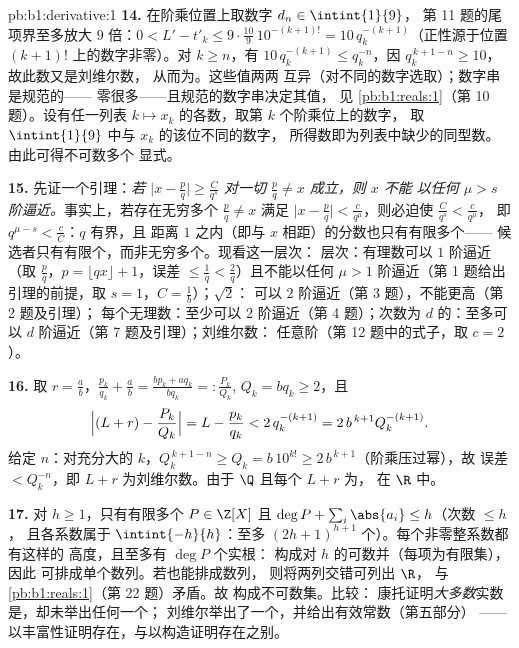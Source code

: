 \begin{solution}{pb:b1:derivative:1}
\textbf{14.} 在阶乘位置上取数字 $d_n \in \intint{1}{9}$，
第 11 题的尾项界至多放大
$9$ 倍：$0 < L' - t'_k \leq 9\cdot\frac{10}{9}\,10^{-(k+1)!} =
10\,q_k^{-(k+1)}$（正性源于位置
$(k+1)!$ 上的数字非零）。对 $k \geq n$，有 $10\,q_k^{-(k+1)} \leq
q_k^{-n}$，因 $q_k^{\,k+1-n} \geq 10$，故此数又是刘维尔数，
从而为。这些值两两
互异（对不同的数字选取）；数字串是规范的——
零很多——且规范的数字串决定其值，
见 \cref{pb:b1:reals:1}（第 10 题）。设有任一列表 $k \mapsto
x_k$ 的各数，取第 $k$ 个阶乘位上的数字，
取 $\intint{1}{9}$ 中与 $x_k$ 的该位不同的数字，
所得数即为列表中缺少的同型数。由此可得不可数多个
显式。

\textbf{15.} 先证一个引理：\emph{若 $\bigl|x - \frac pq\bigr|
\geq \frac{C}{q^s}$ 对一切 $\frac pq \neq x$ 成立，则 $x$ 不能
以任何 $\mu > s$ 阶逼近。}事实上，若存在无穷多个
$\frac pq \neq x$ 满足 $\bigl|x - \frac pq\bigr| <
\frac{c}{q^\mu}$，则必迫使 $\frac{C}{q^s} < \frac{c}{q^\mu}$，
即 $q^{\mu - s} < \frac cC$：$q$ 有界，且
距离 $1$ 之内（即与 $x$ 相距）的分数也只有有限多个——
候选者只有有限个，而非无穷多个。现看这一层次：
层次：有理数可以 $1$ 阶逼近（取 $\frac
pq$，$p = \lfloor qx\rfloor + 1$，误差 $\leq \frac1q <
\frac2q$）且不能以任何 $\mu > 1$ 阶逼近（第 1 题给出
引理的前提，取 $s = 1$，$C = \frac1b$）；$\sqrt2$：
可以 $2$ 阶逼近（第 3 题），不能更高（第 2 题及引理）；
每个无理数：至少可以 $2$ 阶逼近（第 4 题）；次数为
$d$ 的：至多可以 $d$ 阶逼近（第 7 题及引理）；刘维尔数：
任意阶（第 12 题中的式子，取 $c = 2$）。

\textbf{16.} 取 $r = \frac ab$，$\frac{p_k}{q_k} + \frac ab =
\frac{b p_k + a q_k}{b q_k} =: \frac{P_k}{Q_k}$, $Q_k = b q_k
\geq 2$，且
\[
\Bigl|(L + r) - \frac{P_k}{Q_k}\Bigr| = L - \frac{p_k}{q_k}
< 2\,q_k^{-(k+1)} = 2\,b^{\,k+1} Q_k^{-(k+1)} .
\]
给定 $n$：对充分大的 $k$，$Q_k^{\,k+1-n} \geq Q_k = b\,10^{k!}
\geq 2\,b^{\,k+1}$（阶乘压过幂），故
误差 $< Q_k^{-n}$，即 $L + r$ 为刘维尔数。由于 $\Q$ 
且每个 $L + r$ 为，
在 $\R$ 中。

\textbf{17.} 对 $h \geq 1$，只有有限多个 $P \in
\Z[X]$ 且 $\deg P + \sum_i \abs{a_i} \leq h$（次数 $\leq h$，
且各系数属于 $\intint{-h}{h}$：至多
$(2h+1)^{h+1}$ 个）。每个非零整系数都有这样的
高度，且至多有 $\deg P$ 个实根：
构成对 $h$ 的可数并（每项为有限集），因此
可排成单个数列。若也能排成数列，
则将两列交错可列出 $\R$，
与 \cref{pb:b1:reals:1}（第 22 题）矛盾。故
构成不可数集。比较：
康托证明\emph{大多数}实数是，却未举出任何一个；
刘维尔举出了一个，并给出有效常数（第五部分）
——以丰富性证明存在，与以构造证明存在之别。


\end{solution}
